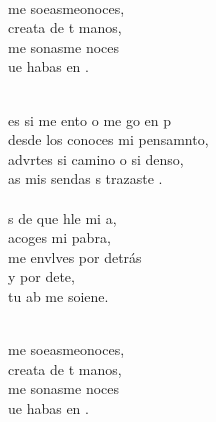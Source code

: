 \begin{cancion}%
	\begin{chorus}%
	       \\
	 me soeasmeonoces, \\
	 creata de t manos, \\
	 me sonasme noces \\
	ue habas en . \\
	\end{chorus}%
	\jump\\
	es si me ento o me go en p \\
	desde los conoces mi pensamnto, \\
	advrtes si camino o si denso, \\
	as mis sendas s trazaste .  \\
\jump\\
	s de que hle mi a, \\
	 acoges mi pabra,  \\
	me envlves por detrás \\
	y por dete,\\
	tu ab me soiene.\\\jump\\
	\begin{chorus}%
	 me soeasmeonoces, \\
	 creata de t manos, \\
	 me sonasme noces \\
	ue habas en . \\
	\end{chorus}%
	\jump\\

\end{cancion}

